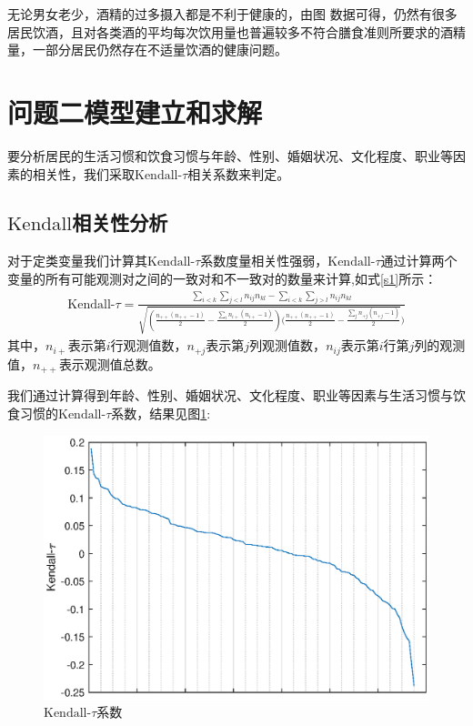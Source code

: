 \documentclass{cumcmthesis}
\begin{document}



无论男女老少，酒精的过多摄入都是不利于健康的，由图  数据可得，仍然有很多居民饮酒，且对各类酒的平均每次饮用量也普遍较多不符合膳食准则所要求的酒精量，一部分居民仍然存在不适量饮酒的健康问题。
\section{问题二模型建立和求解}
要分析居民的生活习惯和饮食习惯与年龄、性别、婚姻状况、文化程度、职业等因素的相关性，我们采取$\text{Kendall-}\tau$相关系数来判定。
\subsection{$\text{Kendall}$相关性分析}
对于定类变量我们计算其$\text{Kendall-}\tau$系数度量相关性强弱，$\text{Kendall-}\tau$通过计算两个变量的所有可能观测对之间的一致对和不一致对的数量来计算,如式\ref{s1}所示：
\begin{eqnarray}
\text{Kendall-}\tau=\frac{\sum_{i<k}\sum_{j<l}n_{ij}n_{kl}-\sum_{i<k}\sum_{j>l}n_{ij}n_{kl}}{\sqrt{(\frac{n_{++}(n_{++}-1)}{2}-\frac{\sum_in_{i+}(n_{i+}-1)}{2})(\frac{n_{++}(n_{++}-1)}{2}-\frac{\sum_jn_{+j}(n_{+j}-1)}{2}})}\label{s1}
\end{eqnarray}
其中，$n_{i+}$表示第$i$行观测值数，$n_{+j}$表示第$j$列观测值数，$n_{ij}$表示第$i$行第$j$列的观测值，$n_{++}$表示观测值总数。

我们通过计算得到年龄、性别、婚姻状况、文化程度、职业等因素与生活习惯与饮食习惯的$\text{Kendall-}\tau$系数，结果见图\ref{2}:
\begin{figure}[h]
\centering
\includegraphics{figures/A1.eps}
\caption{$\text{Kendall-}\tau$系数}\label{2}
\end{figure}
\end{document}
